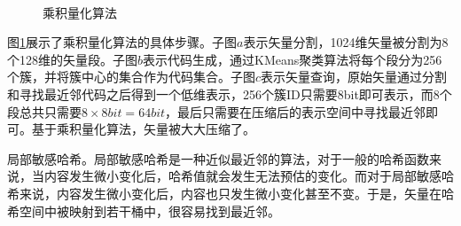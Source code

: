\begin{figure}[H]
    \centering
     \\
    \caption{乘积量化算法}
    \label{fig:prod_quan}
\end{figure}

图\ref{fig:prod_quan}展示了乘积量化算法的具体步骤。子图\(a\)表示矢量分割，1024维矢量被分割为8个128维的矢量段。子图\(b\)表示代码生成，通过KMeans聚类算法将每个段分为256个簇，并将簇中心的集合作为代码集合。子图\(c\)表示矢量查询，原始矢量通过分割和寻找最近邻代码之后得到一个低维表示，256个簇ID只需要8bit即可表示，而8个段总共只需要$8\times 8bit=64bit$，最后只需要在压缩后的表示空间中寻找最近邻即可。基于乘积量化算法，矢量被大大压缩了。

局部敏感哈希\cite{datar2004locality}。局部敏感哈希是一种近似最近邻的算法，对于一般的哈希函数来说，当内容发生微小变化后，哈希值就会发生无法预估的变化。而对于局部敏感哈希来说，内容发生微小变化后，内容也只发生微小变化甚至不变。于是，矢量在哈希空间中被映射到若干桶中，很容易找到最近邻。

